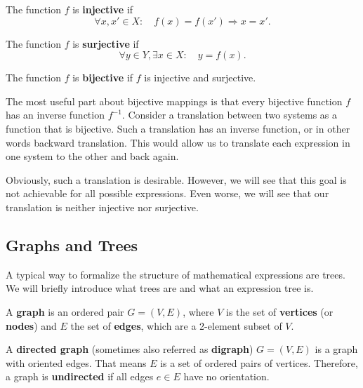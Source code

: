 \begin{definition}
The function $f$ is \textbf{injective} if
\begin{equation}
\forall x,x' \in X: \quad f(x) = f(x') \Rightarrow x = x'.
\end{equation}
\end{definition}

\begin{definition}
The function $f$ is \textbf{surjective} if
\begin{equation}
\forall y \in Y, \exists x \in X: \quad y = f(x).
\end{equation}
\end{definition}

\begin{definition}[Bijection]
The function $f$ is \textbf{bijective} if $f$ is injective and surjective.
\end{definition}

The most useful part about bijective mappings is that every bijective function $f$ has an inverse function $f^{-1}$. Consider a translation between two systems as a function that is bijective. Such a translation has an inverse function, or in other words backward translation. This would allow us to translate each expression in one system to the other and back again.

Obviously, such a translation is desirable. However, we will see that this goal is not achievable for all possible expressions. Even worse, we will see that our translation is neither injective nor surjective.

\subsection{Graphs and Trees}
A typical way to formalize the structure of mathematical expressions are trees. We will briefly introduce what trees are and what an expression tree is.

\begin{definition}[Graph]
A \textbf{graph} is an ordered pair $G=(V,E)$, where $V$ is the set of \textbf{vertices} (or \textbf{nodes}) and $E$ the set of \textbf{edges}, which are a 2-element subset of $V$.
\end{definition}

\begin{definition}
A \textbf{directed graph} (sometimes also referred as \textbf{digraph}) $G = (V,E)$ is a graph with oriented edges. That means $E$ is a set of ordered pairs of vertices. Therefore, a graph is \textbf{undirected} if all edges $e \in E$ have no orientation.
\end{definition}

